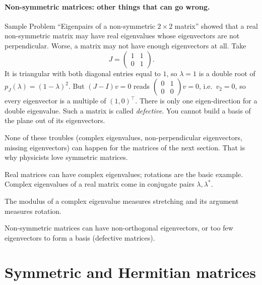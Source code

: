 \paragraph{Non-symmetric matrices: other things that can go wrong.} Sample Problem ``Eigenpairs of a non-symmetric $2\times2$ matrix'' showed that a real non-symmetric matrix may have real eigenvalues whose eigenvectors are not perpendicular. Worse, a matrix may not have enough eigenvectors at all. Take
\begin{equation}
J=\begin{pmatrix}1&1\\0&1\end{pmatrix}.
\end{equation}
It is triangular with both diagonal entries equal to $1$, so $\lambda=1$ is a double root of $p_J(\lambda)=(1-\lambda)^2$. But $(J-I)v=0$ reads $\begin{pmatrix}0&1\\0&0\end{pmatrix}v=0$, i.e.\ $v_2=0$, so every eigenvector is a multiple of $(1,0)^\top$. There is only one eigen-direction for a double eigenvalue. Such a matrix is called \emph{defective}. You cannot build a basis of the plane out of its eigenvectors.

None of these troubles (complex eigenvalues, non-perpendicular eigenvectors, missing eigenvectors) can happen for the matrices of the next section. That is why physicists love symmetric matrices.

\begin{keyideas}
\item Real matrices can have complex eigenvalues; rotations are the basic example. Complex eigenvalues of a real matrix come in conjugate pairs $\lambda,\lambda^*$.
\item The modulus of a complex eigenvalue measures stretching and its argument measures rotation.
\item Non-symmetric matrices can have non-orthogonal eigenvectors, or too few eigenvectors to form a basis (defective matrices).
\end{keyideas}

\section{Symmetric and Hermitian matrices}\label{sec:eigen-hermitian}

